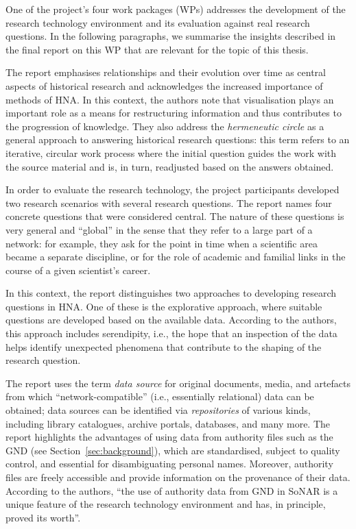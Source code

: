One of the project's four work packages (WPs)
addresses the development of the research technology environment
and its evaluation against real research questions.
In the following paragraphs,
we summarise the insights described in the final report on this WP \autocite{Fangerau2022}
that are relevant for the topic of this thesis.

The report emphasises relationships and their evolution over time
as central aspects of historical research and acknowledges the increased 
importance of methods of HNA. In this context, the authors note that visualisation plays an important role
as a means for restructuring information and thus contributes to the progression of knowledge.
They also address the \emph{hermeneutic circle} \autocite{Malpas2015}
as a general approach to answering historical research questions:
this term refers to an iterative, circular work process
where the initial question guides the work with the source material
and is, in turn, readjusted based on the answers obtained.

In order to evaluate the research technology,
the project participants developed two research scenarios
with several research questions.
The report names four concrete questions that were considered central.
The nature of these questions is very general and \enquote{global}
in the sense that they refer to a large part of a network:
for example, they ask for the point in time when a scientific area became a separate discipline,
or for the role of academic and familial links in the course of a given scientist's career.

In this context, the report distinguishes two approaches to developing research questions
in HNA. One of these is the explorative approach,
where suitable questions are developed based on the available data.
According to the authors, this approach includes serendipity,
i.e., the hope that an inspection of the data helps identify unexpected
phenomena that contribute to the shaping of the research question.

The report uses the term \emph{data source} for original documents, media, and artefacts
from which \enquote{network-compatible} (i.e., essentially relational) data can be obtained;
data sources can be identified via \emph{repositories} of various kinds,
including library catalogues, archive portals, databases, and many more.
The report highlights the advantages of using data from authority files
such as the GND (see Section~\ref{sec:background}), which are standardised,
subject to quality control, and essential for disambiguating personal names.
Moreover, authority files are freely accessible and provide information
on the provenance of their data. According to the authors,
\enquote{the use of authority data from GND in SoNAR is a unique feature
of the research technology environment and has, in principle, proved its worth}.

